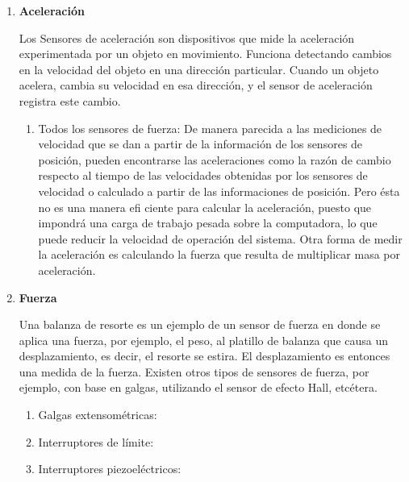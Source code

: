 \begin{enumerate}
\begin{enumerate}
			\begin{figure}[h]
				\centering
				\hfill
			\end{figure}
			
			\end{enumerate}
			
			\item \textbf{Aceleración}
			
			Los Sensores de aceleración son dispositivos que mide la aceleración experimentada por un objeto en movimiento. Funciona detectando cambios en la velocidad del objeto en una dirección particular. Cuando un objeto acelera, cambia su velocidad en esa dirección, y el sensor de aceleración registra este cambio. \cite{Aceleración} \\
			
			\begin{enumerate}
				\item Todos los sensores de fuerza: De manera parecida a las mediciones de velocidad que se dan a partir de la información de los sensores de posición, pueden encontrarse las aceleraciones como la razón de cambio respecto al tiempo de las velocidades obtenidas por los sensores de velocidad o calculado a partir de las informaciones de posición. Pero ésta no es una manera efi ciente para calcular la aceleración, puesto que impondrá una carga de trabajo pesada sobre la computadora, lo que puede reducir la velocidad de operación del sistema. Otra forma de medir la aceleración es calculando la fuerza que resulta de multiplicar masa por aceleración. \cite{saha2010robotics}\\
			\end{enumerate}
				\begin{figure}[h]
				\centering
				\hfill
			\end{figure}
			
			\item \textbf{Fuerza}
			
			Una balanza de resorte es un ejemplo de un sensor de
			fuerza en donde se aplica una fuerza, por ejemplo, el peso, al platillo de balanza que causa un desplazamiento, es decir, el resorte se estira. El desplazamiento es entonces una medida de la fuerza. Existen otros tipos de sensores de fuerza, por ejemplo, con base en galgas, utilizando el sensor de efecto Hall, etcétera. \cite{saha2010robotics}\\
			\begin{enumerate}
				\item Galgas extensométricas:
				
				\item Interruptores de límite:
				
				\item Interruptores piezoeléctricos:
				
			\end{enumerate}
		\end{enumerate}
		
